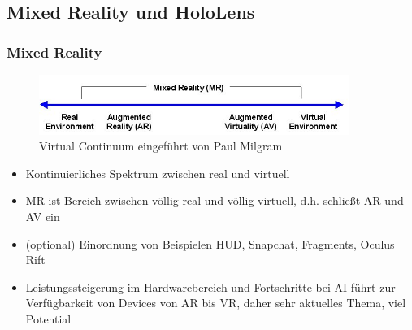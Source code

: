 \subsection{Mixed Reality und HoloLens}
\label{sec-2-1}

\subsubsection{Mixed Reality}
\label{sec-2-1-1}

\begin{figure}[h!]
	\centering
	\includegraphics[width=0.9\textwidth]{images/virtual_continuum.png}
	\caption{Virtual Continuum eingeführt von Paul Milgram \cite{Milgram94}}
	\label{img:virtual_continuum}
\end{figure}

\begin{itemize}
	\item Kontinuierliches Spektrum zwischen real und virtuell
	\item MR ist Bereich zwischen völlig real und völlig virtuell, d.h. schließt AR und AV ein
	\item (optional) Einordnung von Beispielen HUD, Snapchat, Fragments, Oculus Rift
	\item Leistungssteigerung im Hardwarebereich und Fortschritte bei AI führt zur Verfügbarkeit von Devices von AR bis VR, daher sehr aktuelles Thema, viel Potential
\end{itemize}


